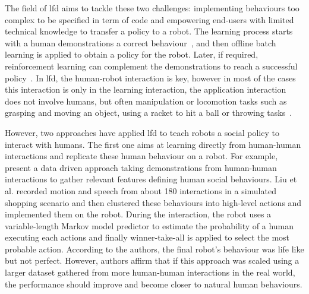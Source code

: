 	    
	The field of \gls{lfd} aims to tackle these two challenges: implementing behaviours too complex to be specified in term of code and empowering end-users with limited technical knowledge to transfer a policy to a robot. The learning process starts with a human demonstrations a correct behaviour~\citep{argall2009survey}, and then offline batch learning is applied to obtain a policy for the robot. Later, if required, reinforcement learning can complement the demonstrations to reach a successful policy~\citep{billard2008robot}.
	In \gls{lfd}, the human-robot interaction is key, however in most of the cases this interaction is only in the learning interaction, the application interaction does not involve humans, but often manipulation or locomotion tasks such as grasping and moving an object, using a racket to hit a ball or throwing tasks~\citep{billard2008robot}.
	
	However, two approaches have applied \gls{lfd} to teach robots a social policy to interact with humans.	The first one aims at learning directly from human-human interactions and replicate these human behaviour on a robot. For example, \citet{liu2014train} present a data driven approach taking demonstrations from human-human interactions to gather relevant features defining human social behaviours. Liu et al. recorded motion and speech from about 180 interactions in a simulated shopping scenario and then clustered these behaviours into high-level actions and implemented them on the robot. During the interaction, the robot uses a variable-length Markov model predictor to estimate the probability of a human executing each actions and finally winner-take-all is applied to select the most probable action. According to the authors, the final robot's behaviour was life like but not perfect. However, authors affirm that if this approach was scaled using a larger dataset gathered from more human-human interactions in the real world, the performance should improve and become closer to natural human behaviours.
    
